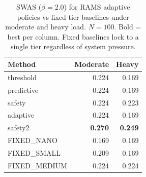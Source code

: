 \begin{table}[t]
\centering
\caption{SWAS ($\beta=2.0$) for RAMS adaptive policies vs fixed-tier baselines under moderate and heavy load. $N=100$. Bold = best per column. Fixed baselines lock to a single tier regardless of system pressure.}
\label{tab:exp7d_baselines}
\begin{tabular}{lrr}
\toprule
Method & Moderate & Heavy \\
\midrule
  threshold & 0.224 & 0.169 \\
  predictive & 0.224 & 0.169 \\
  safety & 0.224 & 0.223 \\
  adaptive & 0.224 & 0.169 \\
  safety2 & \textbf{0.270} & \textbf{0.249} \\
\midrule
  FIXED_NANO & 0.169 & 0.169 \\
  FIXED_SMALL & 0.209 & 0.169 \\
  FIXED_MEDIUM & 0.224 & 0.224 \\
\bottomrule
\end{tabular}
\end{table}